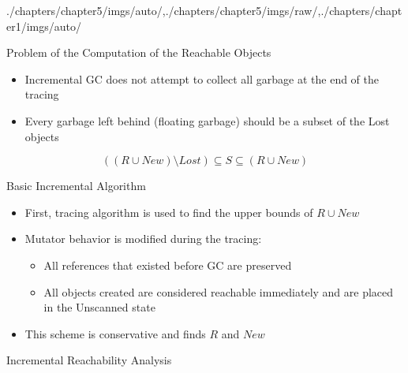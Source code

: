 \begin{graphicspathcontext}{{./chapters/chapter5/imgs/auto/},{./chapters/chapter5/imgs/raw/},{./chapters/chapter1/imgs/auto/}}
\begin{bibunit}[apalike]
\begin{frame}[background=6]{Problem of the Computation of the Reachable Objects}
	\vspace{1cm}
	\begin{itemize}
		\item Incremental GC does not attempt to collect all garbage at the end of the tracing
		\item Every garbage left behind (floating garbage) should be a subset of the Lost objects
	\end{itemize}
	\vspace{1cm}
	\[ \left( \left( R \cup New \right) \setminus Lost \right) \subseteq S \subseteq \left( R \cup New \right) \]
\end{frame}

\begin{frame}[background=8]{{Basic Incremental} Algorithm}
	\begin{itemize}
		\item First, tracing algorithm is used to find the upper bounds of $R \cup New$
		\item Mutator behavior is modified during the tracing:
		\begin{itemize}
			\item All references that existed before GC are preserved
			\item All objects created are considered reachable immediately and are placed in the Unscanned state
		\end{itemize}
		\item This scheme is conservative and finds $R$ and $New$
	\end{itemize}
	\vspace{.5cm}
	\vspace{.5cm}
\end{frame}

\begin{frame}{Incremental Reachability Analysis}
	\begin{rightarrowsequence}
	\end{rightarrowsequence}
\end{frame}


\end{bibunit}
\end{graphicspathcontext}
